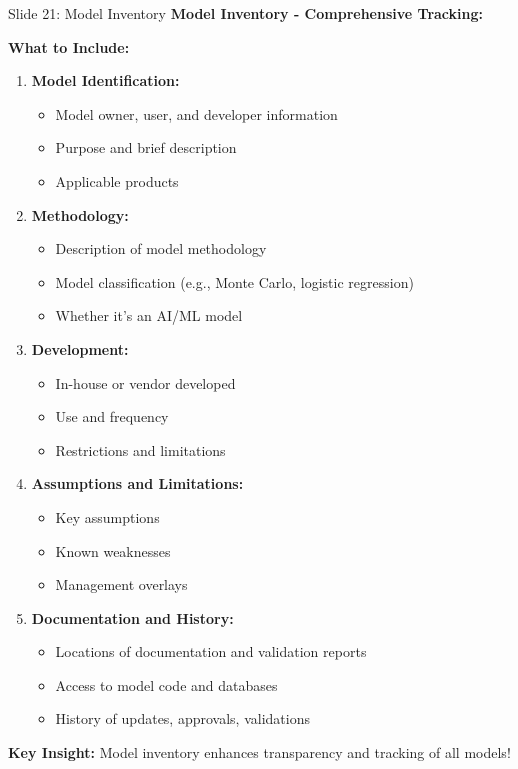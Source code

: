 \documentclass[8pt]{beamer}
\begin{document}
	\begin{frame}{Slide 21: Model Inventory}
		\fontsize{6.5}{7.5}\selectfont
		\textbf{Model Inventory - Comprehensive Tracking:}
		
		\vspace{0.1cm}
		\textbf{What to Include:}
		\begin{enumerate}
			\item \textbf{Model Identification:}
			\begin{itemize}
				\item Model owner, user, and developer information
				\item Purpose and brief description
				\item Applicable products
			\end{itemize}
			\item \textbf{Methodology:}
			\begin{itemize}
				\item Description of model methodology
				\item Model classification (e.g., Monte Carlo, logistic regression)
				\item Whether it's an AI/ML model
			\end{itemize}
			\item \textbf{Development:}
			\begin{itemize}
				\item In-house or vendor developed
				\item Use and frequency
				\item Restrictions and limitations
			\end{itemize}
			\item \textbf{Assumptions and Limitations:}
			\begin{itemize}
				\item Key assumptions
				\item Known weaknesses
				\item Management overlays
			\end{itemize}
			\item \textbf{Documentation and History:}
			\begin{itemize}
				\item Locations of documentation and validation reports
				\item Access to model code and databases
				\item History of updates, approvals, validations
			\end{itemize}
		\end{enumerate}
		
		\textcolor{myblue}{\textbf{Key Insight:}} Model inventory enhances \textcolor{myblue}{transparency and tracking} of all models!
	\end{frame}
	
\end{document}
